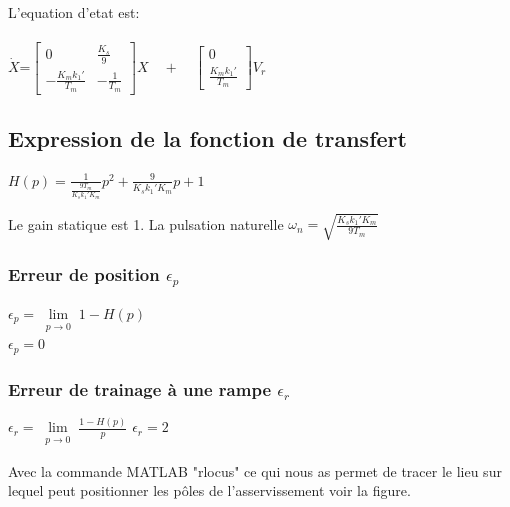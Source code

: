 L'equation d'etat est:\\\\


$\dot{X}$=$\begin{bmatrix}
0&\frac{K_s}{9}\\
-\frac{K_mk_1'}{T_m}&-\frac{1}{T_m}
\end{bmatrix}X
\quad + \quad
\begin{bmatrix}
0\\
\frac{K_mk_1'}{T_m}
\end{bmatrix}V_r
$

\subsection{Expression de la fonction de transfert}


\begin{center}
$H(p)=\frac{1}{\frac{9T_m}{K_sk_1'K_m}}p^2+\frac{9}{K_sk_1'K_m}p+1$
\end{center}


Le gain statique est 1.
La pulsation naturelle $\omega_n=\sqrt{\frac{K_sk_1'K_m}{9T_m}}$

\subsubsection{Erreur de position $\epsilon_p$}
$\epsilon_p=\lim\limits_{\substack{p \rightarrow 0 }} 1-H(p)$\\
$\epsilon_p=0$

\subsubsection{Erreur de trainage à une rampe $\epsilon_r$}
$\epsilon_r=\lim\limits_{\substack{p \rightarrow 0 }} \frac{1-H(p)}{p}$
$\epsilon_r=2$

Avec la commande MATLAB "rlocus" ce qui nous as permet de  tracer le lieu sur lequel peut  positionner les pôles de l'asservissement voir la figure.



